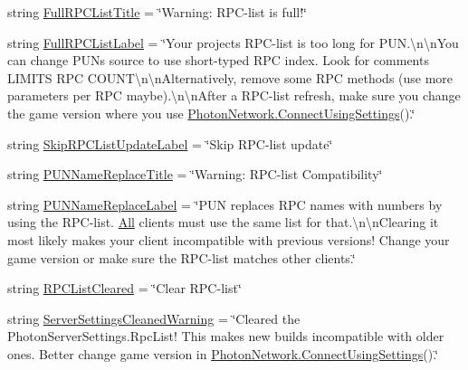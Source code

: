 \begin{DoxyCompactItemize}
\item 
string \hyperlink{class_pun_wizard_text_a7d39669365eb40c15a25f1bf842d6b68}{Full\+R\+P\+C\+List\+Title} = \char`\"{}Warning\+: R\+PC-\/list is full!\char`\"{}
\item 
string \hyperlink{class_pun_wizard_text_a304fd8e76cdaba433a5838962201f4f7}{Full\+R\+P\+C\+List\+Label} = \char`\"{}Your project\textquotesingle{}s R\+PC-\/list is too long for P\+U\+N.\textbackslash{}n\textbackslash{}n\+You can change P\+UN\textquotesingle{}s source to use short-\/typed R\+PC index. Look for comments \textquotesingle{}L\+I\+M\+I\+TS R\+PC C\+O\+U\+NT\textquotesingle{}\textbackslash{}n\textbackslash{}n\+Alternatively, remove some R\+PC methods (use more parameters per R\+PC maybe).\textbackslash{}n\textbackslash{}n\+After a R\+PC-\/list refresh, make sure you change the game version where you use \hyperlink{class_photon_network_a0fdb79bcce45801ec81fbe56ffb939ec}{Photon\+Network.\+Connect\+Using\+Settings}().\char`\"{}
\item 
string \hyperlink{class_pun_wizard_text_a7847e10a84d1d79652a61a148beb650a}{Skip\+R\+P\+C\+List\+Update\+Label} = \char`\"{}Skip R\+PC-\/list update\char`\"{}
\item 
string \hyperlink{class_pun_wizard_text_a645cbabea2e9ffdad71e2689d137ce54}{P\+U\+N\+Name\+Replace\+Title} = \char`\"{}Warning\+: R\+PC-\/list Compatibility\char`\"{}
\item 
string \hyperlink{class_pun_wizard_text_a8b38849007b7e021a16bbe6daaadd0e8}{P\+U\+N\+Name\+Replace\+Label} = \char`\"{}P\+UN replaces R\+PC names with numbers by using the R\+PC-\/list. \hyperlink{group__public_api_ggab84b274b6aa3b3a3d7810361da16170fab1c94ca2fbc3e78fc30069c8d0f01680}{All} clients must use the same list for that.\textbackslash{}n\textbackslash{}n\+Clearing it most likely makes your client incompatible with previous versions! Change your game version or make sure the R\+PC-\/list matches other clients.\char`\"{}
\item 
string \hyperlink{class_pun_wizard_text_a089960fd554d43f35d1cf51a320bdd99}{R\+P\+C\+List\+Cleared} = \char`\"{}Clear R\+PC-\/list\char`\"{}
\item 
string \hyperlink{class_pun_wizard_text_a1fcd4eff5d7841e61870ac8fe2e2158d}{Server\+Settings\+Cleaned\+Warning} = \char`\"{}Cleared the Photon\+Server\+Settings.\+Rpc\+List! This makes new builds incompatible with older ones. Better change game version in \hyperlink{class_photon_network_a0fdb79bcce45801ec81fbe56ffb939ec}{Photon\+Network.\+Connect\+Using\+Settings}().\char`\"{}

\end{DoxyCompactItemize}
